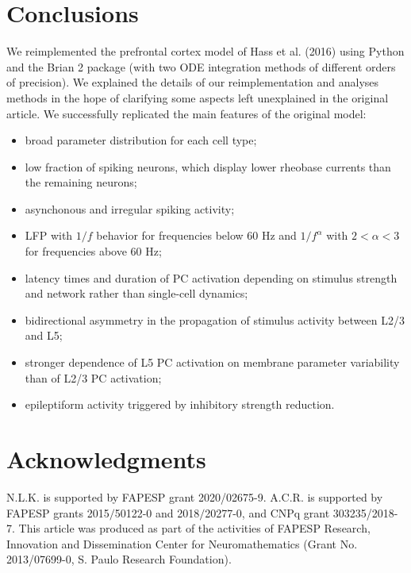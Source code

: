 \section*{Conclusions}

We reimplemented the prefrontal cortex model of Hass et al. (2016) \cite{Hass2016} using Python and the Brian 2 package (with two ODE integration methods of different orders of precision). We explained the details of our reimplementation and analyses methods in the hope of clarifying some aspects left unexplained in the original article. We successfully replicated the main features of the original model: 
\begin{itemize}
    \item broad parameter distribution for each cell type;
    \item low fraction of spiking neurons, which display lower rheobase currents than the remaining neurons;
    \item asynchonous and irregular spiking activity;
    \item LFP with $1/f$ behavior for frequencies below 60 Hz and $1/f^{\alpha}$ with $2 < \alpha <3$ for frequencies above 60 Hz; 
    \item latency times and duration of PC activation depending on stimulus strength and network rather than single-cell dynamics;
    \item bidirectional asymmetry in the propagation of stimulus activity between L2/3 and L5;
    \item stronger dependence of L5 PC activation on membrane parameter variability than of L2/3 PC activation;
    \item epileptiform activity triggered by inhibitory strength reduction.
\end{itemize}

\section*{Acknowledgments}

N.L.K. is supported by FAPESP grant 2020/02675-9. A.C.R. is supported by FAPESP grants 2015$/$50122-0 and 2018$/$20277-0, and CNPq grant 303235/2018-7.
This article was produced as part of the activities of FAPESP  Research, Innovation and Dissemination Center for Neuromathematics (Grant No. 2013/07699-0, S. Paulo Research Foundation).